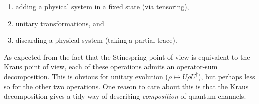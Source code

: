 \documentclass[fleqn,a4paper]{article}
\providecommand{\tightlist}{\setlength{\itemsep}{0pt}\setlength{\parskip}{0pt}}
\theoremstyle{definition}
\theoremstyle{definition}
\theoremstyle{definition}
\theoremstyle{definition}
\theoremstyle{remark}
\begin{document}
\begin{enumerate}
\def\labelenumi{\arabic{enumi}.}
\tightlist
\item
  adding a physical system in a fixed state (via tensoring),
\item
  unitary transformations, and
\item
  discarding a physical system (taking a partial trace).
\end{enumerate}

As expected from the fact that the Stinespring point of view is equivalent to the Kraus point of view, each of these operations admits an operator-sum decomposition.
This is obvious for unitary evolution (\(\rho\mapsto U\rho U^\dagger\)), but perhaps less so for the other two operations.
One reason to care about this is that the Kraus decomposition gives a tidy way of describing \emph{composition} of quantum channels.
\end{document}
